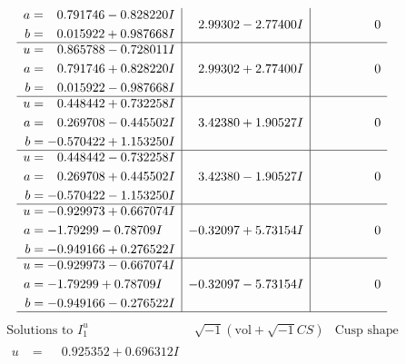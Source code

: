 \documentclass[1p]{elsarticle_modified}
\theoremstyle{definition}
\newcommand{\I}{\sqrt{-1}}
\begin{document}
$$\begin{array}{c|c|c}
\begin{aligned}
a &= \phantom{-}0.791746 - 0.828220 I \\
b &= \phantom{-}0.015922 + 0.987668 I\end{aligned}
 & \phantom{-}2.99302 - 2.77400 I & \phantom{-0.000000 } 0 \\ \hline\begin{aligned}
u &= \phantom{-}0.865788 - 0.728011 I \\
a &= \phantom{-}0.791746 + 0.828220 I \\
b &= \phantom{-}0.015922 - 0.987668 I\end{aligned}
 & \phantom{-}2.99302 + 2.77400 I & \phantom{-0.000000 } 0 \\ \hline\begin{aligned}
u &= \phantom{-}0.448442 + 0.732258 I \\
a &= \phantom{-}0.269708 - 0.445502 I \\
b &= -0.570422 + 1.153250 I\end{aligned}
 & \phantom{-}3.42380 + 1.90527 I & \phantom{-0.000000 } 0 \\ \hline\begin{aligned}
u &= \phantom{-}0.448442 - 0.732258 I \\
a &= \phantom{-}0.269708 + 0.445502 I \\
b &= -0.570422 - 1.153250 I\end{aligned}
 & \phantom{-}3.42380 - 1.90527 I & \phantom{-0.000000 } 0 \\ \hline\begin{aligned}
u &= -0.929973 + 0.667074 I \\
a &= -1.79299 - 0.78709 I \\
b &= -0.949166 + 0.276522 I\end{aligned}
 & -0.32097 + 5.73154 I & \phantom{-0.000000 } 0 \\ \hline\begin{aligned}
u &= -0.929973 - 0.667074 I \\
a &= -1.79299 + 0.78709 I \\
b &= -0.949166 - 0.276522 I\end{aligned}
 & -0.32097 - 5.73154 I & \phantom{-0.000000 } 0\\
 \hline 
 \end{array}$$\newpage$$\begin{array}{c|c|c}  
\text{Solutions to }I^u_{1}& \I (\text{vol} + \sqrt{-1}CS) & \text{Cusp shape}\\
 \hline 
\begin{aligned}
u &= \phantom{-}0.925352 + 0.696312 I \\

\end{aligned}
\end{array}$$
\end{document}

